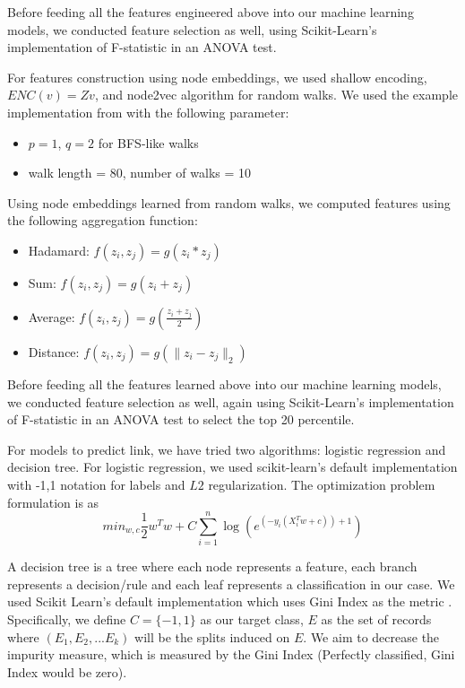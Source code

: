 \documentclass[12pt,twocolumn]{article}
\begin{document}
Before feeding all the features engineered above into our machine learning models, we conducted feature selection as well, using Scikit-Learn's implementation of F-statistic in an ANOVA test.

For features construction using node embeddings, we used shallow encoding, $ENC(v)= Zv$, and node2vec algorithm for random walks.  We used the example implementation from\cite{node2vec} with the following parameter:
\begin{itemize}
    \item $p = 1$, $q = 2$ for BFS-like walks
    \item walk length = 80, number of walks = 10
\end{itemize}
Using node embeddings learned from random walks, we computed features using the following aggregation function:
\begin{itemize}
    \item Hadamard: $f(z_i,z_j) = g(z_i * z_j)$
    \item Sum: $f(z_i,z_j) = g(z_i + z_j)$
    \item Average: $f(z_i,z_j) = g(\frac{z_i + z_j}{2})$
    \item Distance: $f(z_i,z_j) = g(\|z_i - z_j\|_2)$
\end{itemize}

Before feeding all the features learned above into our machine learning models, we conducted feature selection as well, again using Scikit-Learn's implementation of F-statistic in an ANOVA test to select the top 20 percentile.

For models to predict link, we have tried two algorithms: logistic regression and decision tree. For logistic regression, we used scikit-learn's \cite{scikit-learn} default implementation with {-1,1} notation for labels and $L2$ regularization. The optimization problem formulation is as $$min_{w,c} \frac{1}{2} w^Tw + C \sum_{i = 1}^{n} \log (e^{(-y_i (X^T_i w + c)) + 1})$$

A decision tree is a tree where each node represents a feature, each branch represents a decision/rule and each leaf represents a classification in our case. We used Scikit Learn's default implementation which uses Gini Index as the metric \cite{scikit-learn}. Specifically, we define $C = \{-1, 1\}$ as our target class, $E$ as the set of records where $(E_1, E_2,...E_k)$ will be the splits induced on $E$. We aim to decrease the impurity measure, which is measured by the Gini Index (Perfectly classified, Gini Index would be zero). 
\end{document}
